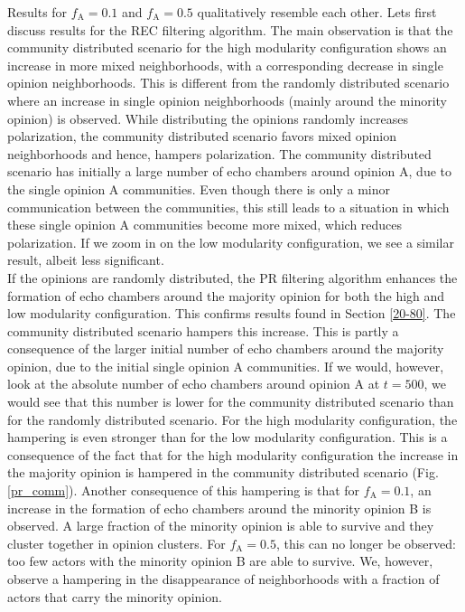 \documentclass[11 pt , letterpaper , twoside , openright]{book}
\begin{document}
Results for $f_\text{A} = 0.1$ and $f_\text{A} = 0.5$ qualitatively resemble each other. Lets first discuss results for the REC filtering algorithm. The main observation is that the community distributed scenario for the high modularity configuration shows an increase in more mixed neighborhoods, with a corresponding decrease in single opinion neighborhoods. This is different from the randomly distributed scenario where an increase in single opinion neighborhoods (mainly around the minority opinion) is observed. While distributing the opinions randomly increases polarization, the community distributed scenario favors mixed opinion neighborhoods and hence, hampers polarization. The community distributed scenario has initially a large number of echo chambers around opinion A, due to the single opinion A communities. Even though there is only a minor communication between the communities, this still leads to a situation in which these single opinion A communities become more mixed, which reduces polarization. If we zoom in on the low modularity configuration, we see a similar result, albeit less significant.\\
\newline
If the opinions are randomly distributed, the PR filtering algorithm enhances the formation of echo chambers around the majority opinion for both the high and low modularity configuration. This confirms results found in Section \ref{20-80}. The community distributed scenario hampers this increase. This is partly a consequence of the larger initial number of echo chambers around the majority opinion, due to the initial single opinion A communities. If we would, however, look at the absolute number of echo chambers around opinion A at $t=500$, we would see that this number is lower for the community distributed scenario than for the randomly distributed scenario. For the high modularity configuration, the hampering is even stronger than for the low modularity configuration. This is a consequence of the fact that for the high modularity configuration the increase in the majority opinion is hampered in the community distributed scenario (Fig. \ref{pr_comm}). Another consequence of this hampering is that for $f_\text{A} = 0.1$, an increase in the formation of echo chambers around the minority opinion B is observed. A large fraction of the minority opinion is able to survive and they cluster together in opinion clusters. For $f_\text{A} = 0.5$, this can no longer be observed: too few actors with the minority opinion B are able to survive. We, however, observe a hampering in the disappearance of neighborhoods with a fraction of actors that carry the minority opinion.
\end{document}
